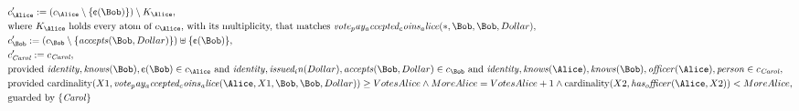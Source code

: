 \begin{align*}
&
c'_
{
\Alice
}
 := 
(c_
{
\Alice
}
 \setminus 
\{
\text{\textcent}
(
\Bob
)
\}
) \setminus K_
{
\Alice
}
,\\
&
\text{where } K_
{
\Alice
}
 \text{ holds every atom of } c_
{
\Alice
}
 \text{, with its multiplicity, that matches } 
\mathit{
vote_pay_accepted_coins_alice
}
(
\ast
,
\Bob
,
\Bob
,
Dollar
)
,\\
&
c'_
{
\Bob
}
 := 
(c_
{
\Bob
}
 \setminus 
\{
\mathit{
accepts
}
(
\Bob
,
Dollar
)
\}
) \uplus 
\{
\text{\textcent}
(
\Bob
)
\}
,\\
&
c'_
{
\mathit{Carol}
}
 := 
c_
{
\mathit{Carol}
}
,\\
&
\text{provided } 
\mathit{
identity
}
,
\mathit{
knows
}
(
\Bob
)
,
\text{\textcent}
(
\Bob
)
 \in c_
{
\Alice
}
 \text{ and } 
\mathit{
identity
}
,
\mathit{
issued_in
}
(
Dollar
)
,
\mathit{
accepts
}
(
\Bob
,
Dollar
)
 \in c_
{
\Bob
}
 \text{ and } 
\mathit{
identity
}
,
\mathit{
knows
}
(
\Alice
)
,
\mathit{
knows
}
(
\Bob
)
,
\mathit{
officer
}
(
\Alice
)
,
\mathit{
person
}
 \in c_
{
\mathit{Carol}
}
,\\
&
\text{provided } 
\mathrm{cardinality}(
X1
,
\mathit{
vote_pay_accepted_coins_alice
}
(
\Alice
,
X1
,
\Bob
,
\Bob
,
Dollar
)
)
\ge
VotesAlice
\land
MoreAlice
=
VotesAlice
+
1
\land
\mathrm{cardinality}(
X2
,
\mathit{
has_officer
}
(
\Alice
,
X2
)
)
<
MoreAlice
,\\
&
\text{guarded by } \{
\mathit{Carol}
\}
\end{align*}
